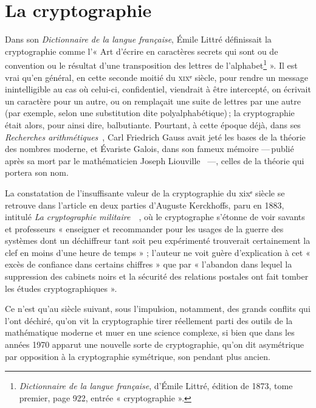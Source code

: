 
\renewcommand*{\UrlFont}{\ttfamily\smaller\relax}

\section{La cryptographie} %
\label{sec:cryptographie}


Dans son \emph{Dictionnaire de la langue française}, Émile Littré définissait la cryptographie comme
l’« Art d'écrire en caractères secrets qui sont ou de convention ou le résultat d'une transposition
des lettres de l'alphabet\footnote{\emph{Dictionnaire de la langue française}, d’Émile Littré,
édition de 1873, tome premier, page 922, entrée « cryptographie ».} ».
Il est vrai qu’en général, en cette seconde moitié  du \textsc{xix}ᵉ siècle, pour rendre un message
inintelligible au cas où celui-ci, confidentiel, viendrait à être intercepté, on écrivait un
caractère pour un autre, ou on remplaçait une suite de lettres par une autre (par exemple, selon une
substitution dite polyalphabétique) ; la cryptographie était alors, pour ainsi dire, balbutiante.
Pourtant, à cette époque déjà, dans ses \emph{Recherches arithmétiques}~\cite{gauss1801}, Carl Friedrich
Gauss avait jeté les bases de la théorie des nombres moderne, et Évariste Galois, dans son fameux
mémoire --- publié après sa mort par le mathématicien Joseph Liouville~\cite{galois1846} ---,
celles de la théorie qui portera son nom.

La constatation de l’insuffisante valeur de la cryptographie du {\sc xix}ᵉ siècle se retrouve dans
l’article en deux parties d’Auguste Kerckhoffs, paru en 1883, intitulé \emph{La cryptographie
militaire}~\cite{kerckhoffs1883premier}~\cite{kerckhoffs1883second}, où le cryptographe s’étonne de voir savants et professeurs « enseigner et
recommander pour les usages de la guerre des systèmes dont un déchiffreur tant soit peu expérimenté
trouverait certainement la clef en moins d’une heure de temps » ; l’auteur ne voit guère
d’explication à cet « excès de confiance dans certains chiffres » que par « l’abandon dans lequel la
suppression des cabinets noirs et la sécurité des relations postales ont fait tomber les études
cryptographiques ».

Ce n’est qu’au siècle suivant, sous l’impulsion, notamment, des grands conflits qui l’ont déchiré,
qu’on vit la cryptographie tirer réellement parti des outils de la mathématique moderne et muer en
une science complexe, si bien que dans les années 1970 apparut une nouvelle sorte de cryptographie,
qu’on dit asymétrique par opposition à la cryptographie symétrique, son pendant plus ancien.

